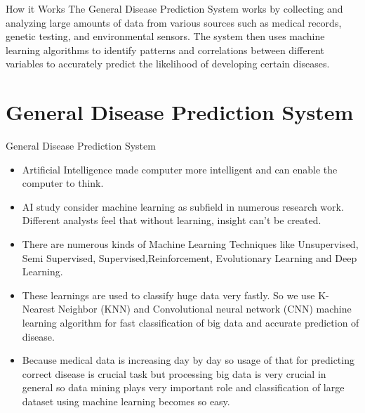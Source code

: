 \documentclass{SKP-beamer}
\begin{document}



\begin{frame}{How it Works}
		The General Disease Prediction System works by collecting and analyzing large amounts of data from various sources such as medical records, genetic testing, and environmental sensors.
		The system then uses machine learning algorithms to identify patterns and correlations between different variables to accurately predict the likelihood of developing certain diseases.
\end{frame}

\section{General Disease Prediction System}

\begin{frame}{General Disease Prediction System}
	\begin{itemize}
	\item Artificial Intelligence made computer more intelligent and can
	enable the computer to think. 
	\item AI study consider machine learning as subfield in numerous research work. Different
	analysts feel that without learning, insight can't be created.
	\item There are numerous kinds of Machine Learning Techniques
	like Unsupervised, Semi Supervised, Supervised,Reinforcement, Evolutionary Learning and Deep Learning.
	\item These learnings are used to classify huge data very fastly. So
	we use K-Nearest Neighbor (KNN) and Convolutional neural
	network (CNN) machine learning algorithm for fast
	classification of big data and accurate prediction of disease.
	\item Because medical data is increasing day by day so usage of that
	for predicting correct disease is crucial task but processing big
	data is very crucial in general so data mining plays very
	important role and classification of large dataset using
	machine learning becomes so easy.
\end{itemize}
\end{frame}
\end{document}
